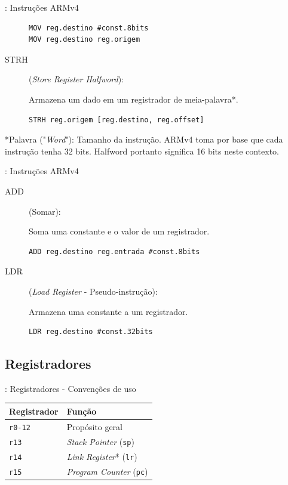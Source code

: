\documentclass{beamer}
\begin{document}
\begin{darkframes}
\begin{frame}[fragile]{\secname: Instruções ARMv4}
\begin{description}
            \begin{verbatim}
MOV reg.destino #const.8bits
MOV reg.destino reg.origem
            \end{verbatim}

        \item[STRH] (\textit{Store Register Halfword}):

            Armazena um dado em um registrador de meia-palavra*.

            \begin{verbatim}
STRH reg.origem [reg.destino, reg.offset]
            \end{verbatim}
    \end{description}

    *Palavra ("\textit{Word}"): Tamanho da instrução. ARMv4 toma por base que cada
    instrução tenha 32 bits. Halfword portanto significa 16 bits neste
    contexto.
\end{frame}

\begin{frame}[fragile]{\secname: Instruções ARMv4}
    \begin{description}
        \item[ADD] (Somar):

            Soma uma constante e o valor de um registrador.

            \begin{verbatim}
ADD reg.destino reg.entrada #const.8bits
            \end{verbatim}

        \item[LDR] (\textit{Load Register} - Pseudo-instrução):

            Armazena uma constante a um registrador.

            \begin{verbatim}
LDR reg.destino #const.32bits
            \end{verbatim}
    \end{description}
\end{frame}

\subsection{Registradores}
\begin{frame}{\secname: Registradores - Convenções de uso}
    \begin{center}
        \begin{tabular}{|l|l|}
            \hline
            Registrador & Função \\\hline
            \texttt{r0-12} & Propósito geral \\
            \texttt{r13} & \textit{Stack Pointer} (\texttt{sp}) \\
            \texttt{r14} & \textit{Link Register}* (\texttt{lr}) \\
            \texttt{r15} & \textit{Program Counter} (\texttt{pc}) \\
            \hline
        \end{tabular}



\end{center}
\end{frame}
\end{darkframes}
\end{document}
